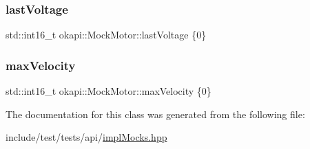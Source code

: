 \mbox{\label{classokapi_1_1MockMotor_a9aa3ed225ab0c3daca85e4428ae94067}} 
\subsubsection{\texorpdfstring{lastVoltage}{lastVoltage}}
{\footnotesize\ttfamily std\+::int16\+\_\+t okapi\+::\+Mock\+Motor\+::last\+Voltage \{0\}\hspace{0.3cm}{\ttfamily [mutable]}}

\mbox{\label{classokapi_1_1MockMotor_abe59f07dccf41f7d31958e4987310601}} 
\subsubsection{\texorpdfstring{maxVelocity}{maxVelocity}}
{\footnotesize\ttfamily std\+::int16\+\_\+t okapi\+::\+Mock\+Motor\+::max\+Velocity \{0\}\hspace{0.3cm}{\ttfamily [mutable]}}



The documentation for this class was generated from the following file\+:\begin{DoxyCompactItemize}
\item 
include/test/tests/api/\mbox{\hyperlink{implMocks_8hpp}{impl\+Mocks.\+hpp}}\end{DoxyCompactItemize}
